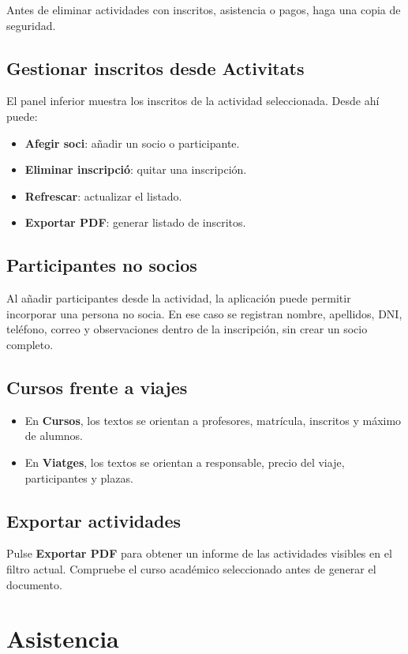 \documentclass[12pt]{article}
\newcommand{\boton}[1]{\textbf{#1}}
\newcommand{\menu}[1]{\textbf{#1}}
\begin{document}
Antes de eliminar actividades con inscritos, asistencia o pagos, haga una copia de seguridad.

\subsection{Gestionar inscritos desde Activitats}
El panel inferior muestra los inscritos de la actividad seleccionada. Desde ahí puede:
\begin{itemize}
  \item \boton{Afegir soci}: añadir un socio o participante.
  \item \boton{Eliminar inscripció}: quitar una inscripción.
  \item \boton{Refrescar}: actualizar el listado.
  \item \boton{Exportar PDF}: generar listado de inscritos.
\end{itemize}

\subsection{Participantes no socios}
Al añadir participantes desde la actividad, la aplicación puede permitir incorporar una persona no socia. En ese caso se registran nombre, apellidos, DNI, teléfono, correo y observaciones dentro de la inscripción, sin crear un socio completo.

\subsection{Cursos frente a viajes}
\begin{itemize}
  \item En \menu{Cursos}, los textos se orientan a profesores, matrícula, inscritos y máximo de alumnos.
  \item En \menu{Viatges}, los textos se orientan a responsable, precio del viaje, participantes y plazas.
\end{itemize}

\subsection{Exportar actividades}
Pulse \boton{Exportar PDF} para obtener un informe de las actividades visibles en el filtro actual. Compruebe el curso académico seleccionado antes de generar el documento.

\section{Asistencia}
\end{document}

